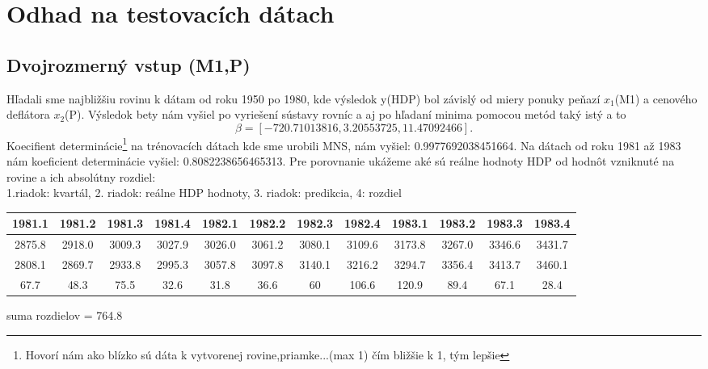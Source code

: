 \documentclass{article}
\begin{document}
\section{Odhad na testovacích dátach}
\subsection{Dvojrozmerný vstup (M1,P)}
Hľadali sme najbližšiu rovinu k dátam od roku 1950 po 1980, kde výsledok y(HDP) bol závislý od miery ponuky peňazí $x_1$(M1) a cenového deflátora $x_2$(P). Výsledok bety nám vyšiel po vyriešení sústavy rovníc a aj po hľadaní minima pomocou metód taký istý a to\[ \beta = [-720.71013816,    3.20553725,   11.47092466].\] Koecifient determinácie\footnote{Hovorí nám ako blízko sú dáta k vytvorenej rovine,priamke...(max 1) čím bližšie k 1, tým lepšie} na trénovacích dátach kde sme urobili MNS, nám vyšiel: 0.9977692038451664.
Na dátach od roku 1981 až 1983 nám koeficient determinácie vyšiel: 0.8082238656465313. Pre porovnanie ukážeme aké sú reálne hodnoty HDP od hodnôt vzniknuté na rovine a ich absolútny rozdiel: \\
1.riadok: kvartál, 2. riadok: reálne HDP hodnoty, 3. riadok: predikcia, 4: rozdiel 
\begin{center}
\begin{tabular}{|| c | c | c | c | c | c | c | c | c | c | c | c ||} 
\hline
 1981.1 & 1981.2 & 1981.3 & 1981.4 & 1982.1 & 1982.2 & 1982.3 & 1982.4 & 1983.1 & 1983.2 & 1983.3 & 1983.4 \\  
\hline\hline
 2875.8 & 2918.0 & 3009.3 & 3027.9 & 3026.0 & 3061.2 & 3080.1 & 3109.6 & 3173.8 & 3267.0 & 3346.6 & 3431.7 \\ 
\hline
 2808.1 & 2869.7 & 2933.8 & 2995.3 & 3057.8 & 3097.8 & 3140.1 & 3216.2 & 3294.7 & 3356.4 & 3413.7 & 3460.1 \\
\hline
 67.7 & 48.3 & 75.5 & 32.6 & 31.8 & 36.6 & 60 & 106.6 & 120.9 & 89.4 & 67.1 & 28.4 \\  
\hline
\end{tabular}
\end{center}
suma rozdielov = 764.8
\end{document}
